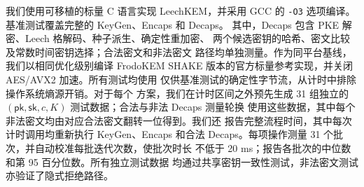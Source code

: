 我们使用可移植的标量 C 语言实现 LeechKEM，并采用 GCC 的
\texttt{-O3} 选项编译。基准测试覆盖完整的 KeyGen、Encaps 和 Decaps。
其中，Decaps 包含 PKE 解密、Leech 格解码、种子派生、确定性重加密、
两个候选密钥的哈希、密文比较及常数时间密钥选择；合法密文和非法密文
路径均单独测量。作为同平台基线，我们以相同优化级别编译 FrodoKEM
SHAKE 版本的官方标量参考实现，并关闭 AES/AVX2 加速。所有测试均使用
仅供基准测试的确定性字节流，从计时中排除操作系统熵源开销。对于每个
方案，我们在计时区间之外预先生成 31 组独立的
$(\mathsf{pk},\mathsf{sk},c,K)$ 测试数据；合法与非法 Decaps 测量轮换
使用这些数据，其中每个非法密文均由对应合法密文翻转一位得到。我们还
报告完整流程时间，其中每次计时调用均重新执行 KeyGen、Encaps 和合法
Decaps。每项操作测量 31 个批次，并自动校准每批迭代次数，使批次时长
不低于 20 ms；报告各批次的中位数和第 95 百分位数。所有独立测试数据
均通过共享密钥一致性测试，非法密文测试亦验证了隐式拒绝路径。
